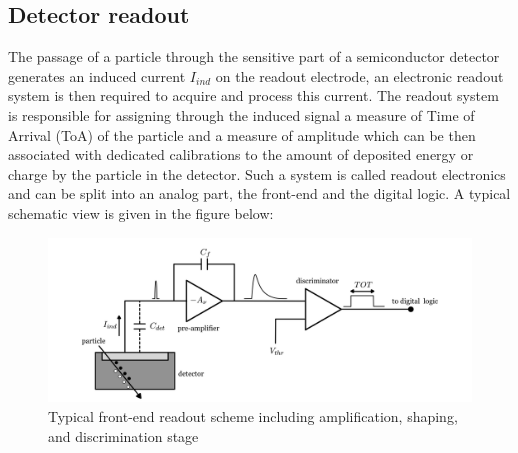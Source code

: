 		\subsection{Detector readout}\label{subsec:2.3.1}
		The passage of a particle through the sensitive part of a semiconductor detector generates an induced current $I_{ind}$ on the readout electrode, an electronic readout system is then required to acquire and process this current. The readout system is responsible for assigning through the induced signal a measure of Time of Arrival (ToA) of the particle and a measure of amplitude which can be then associated with dedicated calibrations to the amount of deposited energy or charge by the particle in the detector. Such a system is called readout electronics and can be split into an analog part, the front-end and the digital logic. A typical schematic view is given in the figure below:  
		\begin{figure}[h]
		\centering
		\includegraphics[width=0.9\linewidth]{files/general_electronics}
		\caption{Typical front-end readout scheme including amplification, shaping, and discrimination stage}
		\label{ }
		\end{figure}
		
